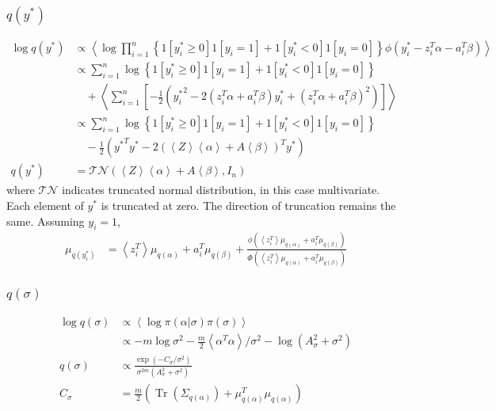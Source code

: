 \documentclass[11pt]{article}
\DeclareMathOperator{\Tr}{Tr}
\begin{document}
\subsubsection{$q\left(y^{*}\right)$}
\begin{align*}
  \log q\left(y^{*}\right) &\propto \left\langle \log \prod_{i=1}^{n}\left\{1\left[y_{i}^{*}\ge 0\right]1\left[y_{i}=1\right] + 1\left[y_{i}^{*}<0\right]1\left[y_{i}=0\right] \right\}\phi\left(y_{i}^{*}-z_{i}^{T}\alpha -a_{i}^{T}\beta\right) \right\rangle \\
  &\propto \sum_{i=1}^{n}\log\left\{1\left[y_{i}^{*}\ge 0\right]1\left[y_{i}=1\right] + 1\left[y_{i}^{*}<0\right]1\left[y_{i}=0\right] \right\} \\
  &\quad + \left\langle\sum_{i=1}^{n}\left[-\frac{1}{2}\left({y_{i}^{*}}^{2} -2\left(z_{i}^{T}\alpha +a_{i}^{T}\beta\right)y_{i}^{*} +\left(z_{i}^{T}\alpha +a_{i}^{T}\beta\right)^{2}\right) \right] \right\rangle\\
  &\propto \sum_{i=1}^{n}\log\left\{1\left[y_{i}^{*}\ge 0\right]1\left[y_{i}=1\right] + 1\left[y_{i}^{*}<0\right]1\left[y_{i}=0\right] \right\} \\
  &\quad -\frac{1}{2}\left({y^{*}}^{T}y^{*} -2\left(\left\langle Z\right\rangle \left\langle \alpha\right\rangle +A\left\langle\beta\right\rangle \right)^{T}y^{*}\right)\\
  q\left(y^{*}\right) &= \mathcal{TN}\left(\left\langle Z\right\rangle \left\langle \alpha\right\rangle +A\left\langle\beta\right\rangle, I_{n}\right)
\end{align*}
where $\mathcal{TN}$ indicates truncated normal distribution, in this case multivariate. Each element of $y^{*}$ is truncated at zero. The direction of truncation remains the same. Assuming $y_{i}=1$,
\begin{align*}
  \mu_{q\left(y_{i}^{*}\right)} &= \left\langle z_{i}^{T}\right\rangle \mu_{q\left(\alpha\right)} + a_{i}^{T}\mu_{q\left(\beta\right)} + \frac{\phi\left(\left\langle z_{i}^{T}\right\rangle \mu_{q\left(\alpha\right)} + a_{i}^{T}\mu_{q\left(\beta\right)}\right)}{\Phi\left(\left\langle z_{i}^{T}\right\rangle \mu_{q\left(\alpha\right)} + a_{i}^{T}\mu_{q\left(\beta\right)}\right)}
\end{align*}
\subsubsection{$q\left(\sigma\right)$}
\begin{align*}
  \log q\left(\sigma\right) &\propto \left\langle \log \pi\left(\alpha|\sigma\right)\pi\left(\sigma\right) \right\rangle\\
  &\propto -m\log \sigma^{2} -\frac{m}{2}\left\langle \alpha^{T}\alpha \right\rangle /\sigma^{2} -\log \left(A_{\sigma}^{2} +\sigma^{2}\right)\\
  q\left(\sigma\right) &\propto \frac{\exp \left(-C_{\sigma}/\sigma^{2}\right)}{\sigma^{2m}\left(A_{\sigma}^{2}+\sigma^{2}\right)}\\
  C_{\sigma} &= \frac{m}{2}\left(\Tr\left(\Sigma_{q\left(\alpha\right)}\right) + \mu_{q\left(\alpha\right)}^{T}\mu_{q\left(\alpha\right)}\right)
\end{align*}
\end{document}
